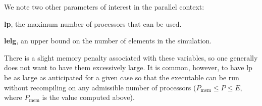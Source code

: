 We note two other parameters of interest in the parallel context:
\begin{description}
\item{\bf lp}, the maximum number of processors that can be used.
\item{\bf lelg}, an upper bound on the number of elements in the simulation.
\end{description}
\noindent
There is a slight memory penalty associated with these variables, so
one generally does not want to have them excessively large.  It is 
common, however, to have lp be as large as anticipated for a given
case so that the executable can be run without recompiling on
any admissible number of processors ($P_{\mbox{mem}} \le P \le E$,
where $P_{\mbox{mem}}$ is the value computed above).

